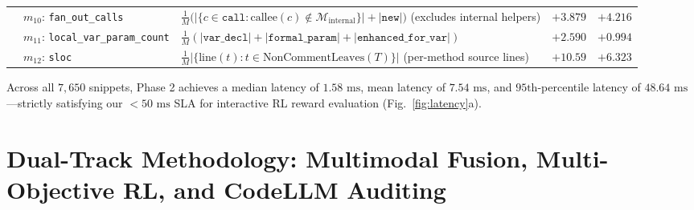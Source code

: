 \documentclass[conference]{IEEEtran}
\begin{document}
\begin{table}[t]
\begin{tabular}{@{}llp{8.4cm}cc@{}}
 & $m_{10}$: \texttt{fan\_out\_calls} & $\frac{1}{M}\big(|\{c\in\texttt{call} : \text{callee}(c) \notin \mathcal{M}_{\text{internal}}\}| + |\texttt{new}|\big)$ (excludes internal helpers) & $+3.879$ & $+4.216$ \\
 & $m_{11}$: \texttt{local\_var\_param\_count} & $\frac{1}{M}(|\texttt{var\_decl}| + |\texttt{formal\_param}| + |\texttt{enhanced\_for\_var}|)$ & $+2.590$ & $+0.994$ \\
 & $m_{12}$: \texttt{sloc} & $\frac{1}{M}|\{\text{line}(t) : t \in \text{NonCommentLeaves}(T)\}|$ (per-method source lines) & $+10.59$ & $+6.323$ \\
\bottomrule
\end{tabular}
\end{table}

Across all $7{,}650$ snippets, Phase 2 achieves a median latency of \textbf{$1.58\text{ ms}$}, mean latency of \textbf{$7.54\text{ ms}$}, and $95\text{th}$-percentile latency of \textbf{$48.64\text{ ms}$}---strictly satisfying our $<50\text{ ms}$ SLA for interactive RL reward evaluation (Fig.~\ref{fig:latency}a).

\section{Dual-Track Methodology: Multimodal Fusion, Multi-Objective RL, and CodeLLM Auditing}
\label{sec:method}
\end{document}

